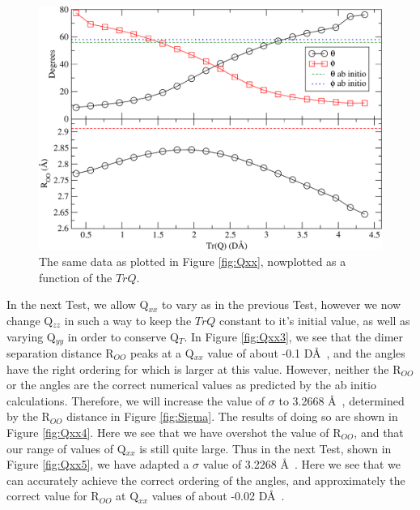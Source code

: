 \begin{figure}[h!]
\includegraphics[width = \linewidth]{Figures/Test4_plot2.pdf}
\caption{\label{fig:Qxx2} The same data as plotted in Figure \ref{fig:Qxx}, nowplotted as a function of the $TrQ$.}
\end{figure}

In the next Test, we allow Q$_{xx}$ to vary as in the previous Test, however
we now change Q$_{zz}$ in such a way to keep the $TrQ$ constant to it's 
initial value, as well as varying Q$_{yy}$ in order to conserve Q$_T$. 
In Figure \ref{fig:Qxx3}, we see that the dimer separation 
distance R$_{OO}$ peaks at a Q$_{xx}$ value of about -0.1 D\AA~, and the angles
have the right ordering for which is larger at this value. However, neither 
the R$_{OO}$ or the angles are the correct numerical values as predicted by
the ab initio calculations. Therefore, we will increase the value of 
$\sigma$ to 3.2668 \AA~, determined by the R$_{OO}$ distance in Figure 
\ref{fig:Sigma}. The results of doing so are shown in Figure \ref{fig:Qxx4}. 
Here we see that we have overshot the value of R$_{OO}$, and that our range of
values of Q$_{xx}$ is still quite large. Thus in the next Test, shown in
Figure \ref{fig:Qxx5}, we have adapted a $\sigma$ value of 3.2268 \AA~. Here we
see that we can accurately achieve the correct ordering of the angles, and
approximately 
the correct value for R$_{OO}$ at Q$_{xx}$ values of about -0.02 D\AA~. 

